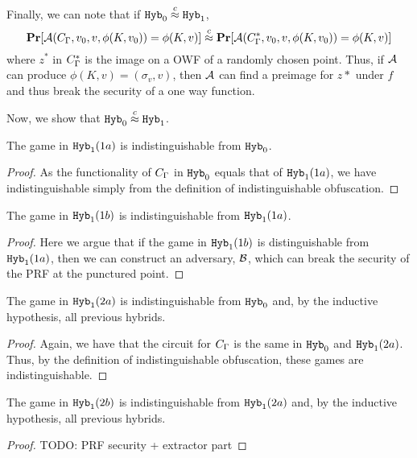 	Finally, we can note that if $\texttt{Hyb}_0 \overset{c}{\approx} \texttt{Hyb}_1$,
	\begin{equation*}
		\operatorname*{\mathbf{Pr}}[\mathcal{A}(C_\Gamma, v_0, v, \phi(K, v_0)) = \phi(K, v)] 
		\overset{c}{\approx}
		\operatorname*{\mathbf{Pr}}[\mathcal{A}(C_\Gamma^*, v_0, v, \phi(K, v_0)) = \phi(K, v)]
	\end{equation*}
	where $z^*$ in $C_\Gamma^*$	is the image on a OWF of a randomly chosen point.
	Thus, if $\mathcal{A}$ can produce $\phi(K, v) = (\sigma_v, v)$, then $\mathcal{A}$
	can find a preimage for $z*$ under $f$ and thus break the security of a one way function.

	Now, we show that $\texttt{Hyb}_0 \overset{c}{\approx} \texttt{Hyb}_1$.

	\begin{lemma}
		The game in $\texttt{Hyb}_1 (1a)$ is indistinguishable from $\texttt{Hyb}_0$.
		\begin{proof}
			As the functionality of $C_\Gamma$ in $\texttt{Hyb}_0$ equals that of $\texttt{Hyb}_1 (1a)$,
			we have indistinguishable simply from the definition of indistinguishable obfuscation.
		\end{proof}
	\end{lemma}

	\begin{lemma}
		The game in $\texttt{Hyb}_1 (1b)$ is indistinguishable from $\texttt{Hyb}_1 (1a)$.
		\begin{proof}
			Here we argue that if the game in $\texttt{Hyb}_1 (1b)$ is distinguishable from
			$\texttt{Hyb}_1 (1a)$, then we can construct an adversary, $\mathcal{B}$, which can break the security of the PRF
			at the punctured point. 


		\end{proof}
	\end{lemma}

	\begin{lemma}
		The game in $\texttt{Hyb}_1 (2a)$ is indistinguishable from $\texttt{Hyb}_0$ and, by the inductive hypothesis, all previous hybrids.
		\begin{proof}
			Again, we have that the circuit for $C_\Gamma$ is the same in $\texttt{Hyb}_0$ and $\texttt{Hyb}_1 (2a)$.
			Thus, by the definition of indistinguishable obfuscation, these games are indistinguishable.
		\end{proof}
	\end{lemma}

	\begin{lemma}
		The game in $\texttt{Hyb}_1 (2b)$ is indistinguishable from $\texttt{Hyb}_1 (2a)$ and, by the inductive hypothesis, all previous hybrids.
		\begin{proof}
			TODO: PRF security + extractor part
		\end{proof}
	\end{lemma}

	